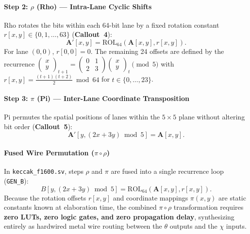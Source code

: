 \paragraph{Step 2: $\rho$ (Rho) --- Intra-Lane Cyclic Shifts}
Rho rotates the bits within each 64-bit lane by a fixed rotation constant $r[x, y] \in \{0, 1, \dots, 63\}$ (\textbf{Callout~4}):
\begin{equation}
\mathbf{A}'[x, y] = \text{ROL}_{64}(\mathbf{A}[x, y], r[x, y]).
\label{eq:rho_step}
\end{equation}
For lane $(0, 0)$, $r[0, 0] = 0$. The remaining 24 offsets are defined by the recurrence $\begin{pmatrix} x \\ y \end{pmatrix}_{t+1} = \begin{pmatrix} 0 & 1 \\ 2 & 3 \end{pmatrix} \begin{pmatrix} x \\ y \end{pmatrix}_t \pmod 5$ with $r[x, y] = \frac{(t+1)(t+2)}{2} \bmod 64$ for $t \in \{0, \dots, 23\}$.

\paragraph{Step 3: $\pi$ (Pi) --- Inter-Lane Coordinate Transposition}
Pi permutes the spatial positions of lanes within the $5 \times 5$ plane without altering bit order (\textbf{Callout~5}):
\begin{equation}
\mathbf{A}'[y, (2x + 3y) \bmod 5] = \mathbf{A}[x, y].
\label{eq:pi_step}
\end{equation}

\paragraph{Fused Wire Permutation ($\pi \circ \rho$)}
In \texttt{keccak\_f1600.sv}, steps $\rho$ and $\pi$ are fused into a single recurrence loop (\texttt{GEN\_B}):
\begin{equation}
B[y, (2x + 3y) \bmod 5] = \text{ROL}_{64}(\mathbf{A}[x, y], r[x, y]).
\label{eq:fused_pi_rho}
\end{equation}
Because the rotation offsets $r[x, y]$ and coordinate mappings $\pi(x, y)$ are static constants known at elaboration time, the combined $\pi \circ \rho$ transformation requires \textbf{zero LUTs, zero logic gates, and zero propagation delay}, synthesizing entirely as hardwired metal wire routing between the $\theta$ outputs and the $\chi$ inputs.

